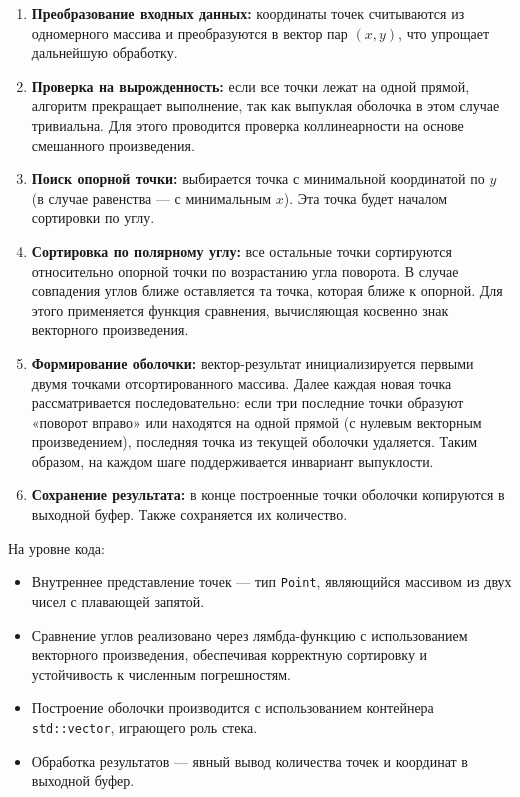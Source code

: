 \documentclass[12pt,a4paper]{extarticle}
\begin{document}
\begin{enumerate}
    \item \textbf{Преобразование входных данных:} координаты точек считываются из одномерного массива и преобразуются в вектор пар $(x, y)$, что упрощает дальнейшую обработку.
    
    \item \textbf{Проверка на вырожденность:} если все точки лежат на одной прямой, алгоритм прекращает выполнение, так как выпуклая оболочка в этом случае тривиальна. Для этого проводится проверка коллинеарности на основе смешанного произведения.

    \item \textbf{Поиск опорной точки:} выбирается точка с минимальной координатой по $y$ (в случае равенства — с минимальным $x$). Эта точка будет началом сортировки по углу.

    \item \textbf{Сортировка по полярному углу:} все остальные точки сортируются относительно опорной точки по возрастанию угла поворота. В случае совпадения углов ближе оставляется та точка, которая ближе к опорной. Для этого применяется функция сравнения, вычисляющая косвенно знак векторного произведения.

    \item \textbf{Формирование оболочки:} вектор-результат инициализируется первыми двумя точками отсортированного массива. Далее каждая новая точка рассматривается последовательно: если три последние точки образуют «поворот вправо» или находятся на одной прямой (с нулевым векторным произведением), последняя точка из текущей оболочки удаляется. Таким образом, на каждом шаге поддерживается инвариант выпуклости.

    \item \textbf{Сохранение результата:} в конце построенные точки оболочки копируются в выходной буфер. Также сохраняется их количество.
\end{enumerate}

На уровне кода:

\begin{itemize}
    \item Внутреннее представление точек — тип \texttt{Point}, являющийся массивом из двух чисел с плавающей запятой.
    \item Сравнение углов реализовано через лямбда-функцию с использованием векторного произведения, обеспечивая корректную сортировку и устойчивость к численным погрешностям.
    \item Построение оболочки производится с использованием контейнера \texttt{std::vector}, играющего роль стека.
    \item Обработка результатов — явный вывод количества точек и координат в выходной буфер.
\end{itemize}
\end{document}

